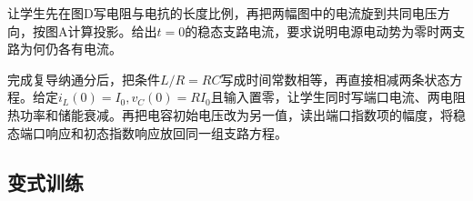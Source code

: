\documentclass[UTF8,fontset=fandol,a4paper,11pt]{ctexart}
\begin{document}
让学生先在图D写电阻与电抗的长度比例，再把两幅图中的电流旋到共同电压方向，按图A计算投影。给出$t=0$的稳态支路电流，要求说明电源电动势为零时两支路为何仍各有电流。

完成复导纳通分后，把条件$L/R=RC$写成时间常数相等，再直接相减两条状态方程。给定$i_L(0)=I_0,v_C(0)=RI_0$且输入置零，让学生同时写端口电流、两电阻热功率和储能衰减。再把电容初始电压改为另一值，读出端口指数项的幅度，将稳态端口响应和初态指数响应放回同一组支路方程。



\subsection*{变式训练}
\end{document}
